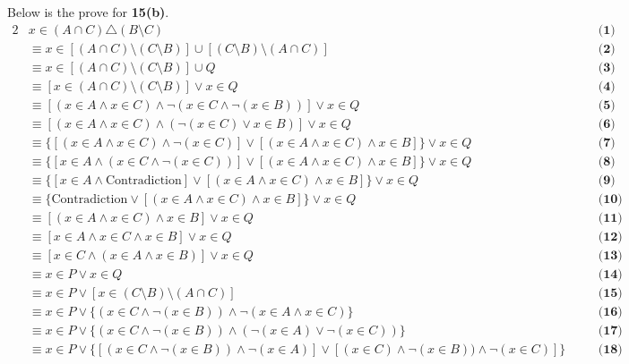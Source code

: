 Below is the prove for \textbf{15(b)}.
\begin{alignat*}{2}
&x \in (A \cap C) \triangle (B \setminus C) && \quad \textbf{(1)}\\
&\equiv x \in [(A \cap C) \setminus (C \setminus B)] \cup [(C \setminus B) \setminus (A \cap C)] && \quad \textbf{(2)}\\
&\equiv x \in [(A \cap C) \setminus (C \setminus B)] \cup Q && \quad \textbf{(3)}\\
&\equiv [x \in (A \cap C) \setminus (C \setminus B)] \vee x \in Q && \quad \textbf{(4)}\\
&\equiv [(x \in A \wedge x \in C) \wedge \neg (x \in C \wedge \neg (x \in B))] \vee x \in Q && \quad \textbf{(5)}\\
&\equiv [(x \in A \wedge x \in C) \wedge (\neg (x \in C) \vee x \in B)] \vee x \in Q && \quad \textbf{(6)}\\
&\equiv \{[(x \in A \wedge x \in C) \wedge \neg (x \in C)] \vee [(x \in A \wedge x \in C) \wedge x \in B]\} \vee x \in Q && \quad \textbf{(7)}\\
&\equiv \{[x \in A \wedge (x \in C \wedge \neg (x \in C))] \vee [(x \in A \wedge x \in C) \wedge x \in B]\} \vee x \in Q && \quad \textbf{(8)}\\
&\equiv \{[x \in A \wedge \text{Contradiction}] \vee [(x \in A \wedge x \in C) \wedge x \in B]\} \vee x \in Q && \quad \textbf{(9)}\\
&\equiv \{\text{Contradiction} \vee [(x \in A \wedge x \in C) \wedge x \in B]\} \vee x \in Q && \quad \textbf{(10)}\\
&\equiv [(x \in A \wedge x \in C) \wedge x \in B] \vee x \in Q && \quad \textbf{(11)}\\
&\equiv [x \in A \wedge x \in C \wedge x \in B] \vee x \in Q && \quad \textbf{(12)}\\
&\equiv [x \in C \wedge (x \in A \wedge x \in B)] \vee x \in Q && \quad \textbf{(13)}\\
&\equiv x \in P \vee x \in Q && \quad \textbf{(14)}\\
&\equiv x \in P \vee [x \in (C \setminus B) \setminus (A \cap C)] && \quad \textbf{(15)}\\
&\equiv x \in P \vee \{(x \in C \wedge \neg (x \in B)) \wedge \neg (x \in A \wedge x \in C)\} && \quad \textbf{(16)}\\
&\equiv x \in P \vee \{(x \in C \wedge \neg ( x \in B)) \wedge (\neg (x \in A) \vee \neg (x \in C))\} && \quad \textbf{(17)}\\
&\equiv x \in P \vee \{[(x \in C \wedge \neg (x \in B)) \wedge \neg (x \in A)] \vee [(x \in C) \wedge \neg (x \in B)) \wedge \neg (x \in C)]\} && \quad \textbf{(18)}\\

\end{alignat*}
